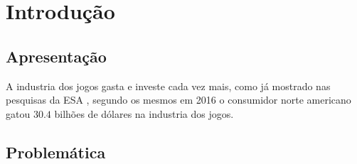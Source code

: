 
\chapter{Introdução}

\section{Apresentação}
A industria dos jogos gasta e investe cada vez mais, como já mostrado nas
pesquisas da ESA \cite{entertainment2017essential}, segundo os mesmos em 2016 o
consumidor norte americano gatou $30.4$ bilhões de dólares na industria dos
jogos.

\section{Problemática}







